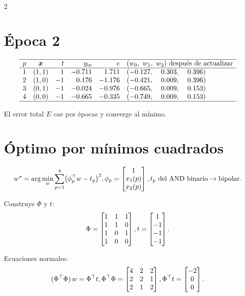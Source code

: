 \documentclass[11pt]{article}
\begin{document}
\begin{multicols}{2}
\section*{Época 2}
\begingroup\small
\[
\begin{array}{c@{\quad}c@{\quad}r@{\quad}r@{\quad}r@{\quad}l}
\hline
p & \bm{x} & t & y_{\text{in}} & e & (w_0,\ w_1,\ w_2)\ \text{después de actualizar}\\
\hline
1 & (1,1) & \phantom{-}1  & -0.711          & \phantom{-}1.711 & (-0.127,\ \phantom{-}0.303,\ \phantom{-}0.396)\\
2 & (1,0) & -1            & \phantom{-}0.176 & -1.176           & (-0.421,\ \phantom{-}0.009,\ \phantom{-}0.396)\\
3 & (0,1) & -1            & -0.024           & -0.976           & (-0.665,\ \phantom{-}0.009,\ \phantom{-}0.153)\\
4 & (0,0) & -1            & -0.665           & -0.335           & (-0.749,\ \phantom{-}0.009,\ \phantom{-}0.153)\\
\hline
\end{array}
\]
\endgroup

El error total $E$ cae por épocas y converge al mínimo.

\section*{Óptimo por mínimos cuadrados}
\[
w^\star=\arg\min_{w}\sum_{p=1}^4\bigl(\phi_p^\top w-t_p\bigr)^2,
\\
\phi_p=\begin{bmatrix}1\\ x_1(p)\\ x_2(p)\end{bmatrix},\\
t_p\ \text{del AND binario}\to\text{bipolar}.
\]

\noindent Construye $\Phi$ y $t$:
\[
\Phi=\begin{bmatrix}
1&1&1\\
1&1&0\\
1&0&1\\
1&0&0
\end{bmatrix},
\\
t=\begin{bmatrix}
1\\-1\\-1\\-1
\end{bmatrix}.
\]

\noindent Ecuaciones normales:
\[
(\Phi^\top\Phi)\,w=\Phi^\top t,
\\
\Phi^\top\Phi=\begin{bmatrix}4&2&2\\2&2&1\\2&1&2\end{bmatrix},\\
\Phi^\top t=\begin{bmatrix}-2\\0\\0\end{bmatrix}.
\]


\end{multicols}
\end{document}
